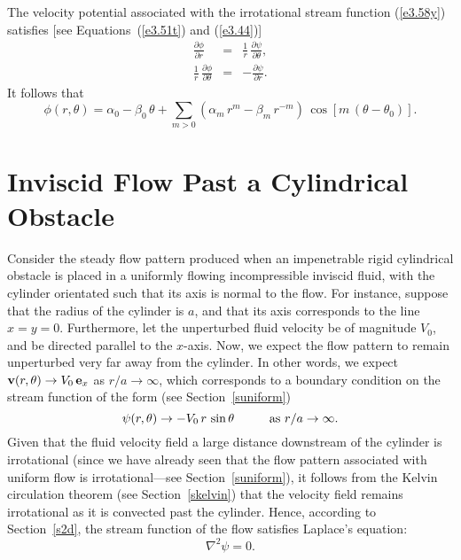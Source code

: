 The velocity potential associated with the irrotational stream function (\ref{e3.58y}) satisfies [see Equations~(\ref{e3.51t}) and
(\ref{e3.44})]
\begin{eqnarray}
\frac{\partial\phi}{\partial r} &=& \frac{1}{r}\,\frac{\partial\psi}{\partial\theta},\\[0.5ex]
\frac{1}{r}\,\frac{\partial\phi}{\partial\theta} &=&-\frac{\partial\psi}{\partial r}.
\end{eqnarray}
It follows that
\begin{equation}
\phi(r,\theta) = \alpha_0-\beta_0\,\theta+\sum_{m>0}(\alpha_m\,r^m-\beta_m\,r^{-m})\,\cos[m\,(\theta-\theta_0)].
\end{equation}

\section{Inviscid Flow Past a Cylindrical Obstacle}\label{scylo}
Consider the steady flow pattern produced when an impenetrable  rigid cylindrical obstacle is placed in a uniformly flowing
incompressible inviscid fluid,  with the cylinder orientated such that its axis is normal to the flow. For instance, suppose that the radius of the cylinder is 
 $a$, and that its axis  corresponds to the line  $x=y=0$. Furthermore, let the unperturbed fluid velocity be of magnitude $V_0$, and 
be directed parallel to the $x$-axis.  Now, we expect the
flow pattern to remain unperturbed very far away from the cylinder. In other words,
we expect  ${\bf v}(r,\theta)\rightarrow V_0\,{\bf e}_x$ as $r/a\rightarrow\infty$, 
which corresponds to a boundary condition on the stream function of the form (see Section~\ref{suniform})
\begin{equation}\label{e3.88}
\psi(r,\theta)\rightarrow -V_0\,r\,\sin\theta\mbox{\hspace{1cm}as $r/a\rightarrow\infty$}.
\end{equation}
Given that the fluid velocity field a large distance downstream of the cylinder is irrotational (since we
have already seen that the flow pattern associated with uniform
flow is irrotational---see Section~\ref{suniform}), it follows from the Kelvin circulation theorem (see Section~\ref{skelvin})
that the velocity field remains irrotational as it is convected past the cylinder. Hence, according to Section~\ref{s2d}, the stream function of the
flow satisfies Laplace's equation:
\begin{equation}\label{e3.89}
\nabla^2\psi = 0.
\end{equation}
